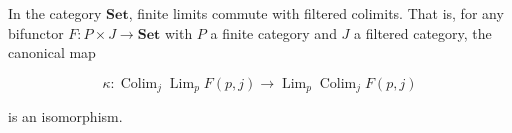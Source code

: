 In the category $\mathbf{Set}$, finite limits commute with filtered colimits. That is, for any bifunctor $F : P \times J \rightarrow \mathbf{Set}$ with $P$ a finite category and $J$ a filtered category, the canonical map

$$\kappa : \operatorname{Colim}_j \operatorname{Lim}_p F(p,j) \rightarrow \operatorname{Lim}_p \operatorname{Colim}_j F(p,j)$$

is an isomorphism.
